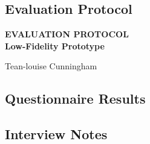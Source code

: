 \documentclass[a4 paper, 12pt]{article}
\begin{document}
    \subsection{Evaluation Protocol}
    \begin{mdframed}[linewidth=2pt]
        \begin{center}
            \bigskip
            \Huge            
            \textbf{EVALUATION PROTOCOL\\
            Low-Fidelity Prototype}
            
            \Large           
            Tean-louise Cunningham
        \end{center}
     
    \end{mdframed}

    \pagebreak
    
    


    \pagebreak
    
    

    \pagebreak
    \subsection{Questionnaire Results}

    \pagebreak
    \subsection{Interview Notes}
\end{document}
